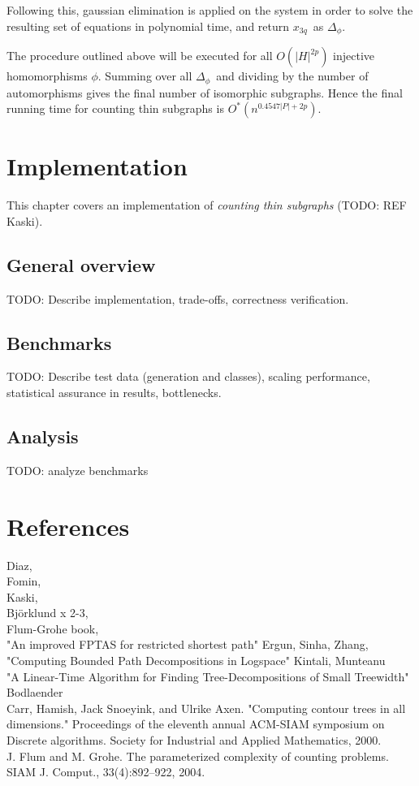 \documentclass[a4paper,11pt]{report}
\theoremstyle{plain}
\theoremstyle{definition}
\begin{document}
Following this, gaussian elimination is applied on the system in order to solve the resulting set of equations in polynomial time, and return $x_{3q}$ as $\Delta_\phi$.

The procedure outlined above will be executed for all $O(|H|^{2p})$ injective homomorphisms $\phi$.
Summing over all $\Delta_\phi$ and dividing by the number of automorphisms gives the final number of isomorphic subgraphs.
Hence the final running time for counting thin subgraphs is $O^*(n^{0.4547|P| + 2p})$.

\chapter{Implementation}
This chapter covers an implementation of \emph{counting thin subgraphs} (TODO: REF Kaski).

\section{General overview}
TODO: Describe implementation, trade-offs, correctness verification.

\section{Benchmarks}
TODO: Describe test data (generation and classes), scaling performance,
statistical assurance in results, bottlenecks.

\section{Analysis}
TODO: analyze benchmarks

\chapter*{References}

Diaz,\\
Fomin,\\
Kaski,\\
Björklund x 2-3,\\
Flum-Grohe book, \\
"An improved FPTAS for restricted shortest path" Ergun, Sinha, Zhang,\\
"Computing Bounded Path Decompositions in Logspace" Kintali, Munteanu\\
"A Linear-Time Algorithm for Finding Tree-Decompositions of Small Treewidth" Bodlaender\\
Carr, Hamish, Jack Snoeyink, and Ulrike Axen. "Computing contour trees in all dimensions." Proceedings of the eleventh annual ACM-SIAM symposium on Discrete algorithms. Society for Industrial and Applied Mathematics, 2000.\\
J. Flum and M. Grohe. The parameterized complexity of counting problems. SIAM J. Comput., 33(4):892–922, 2004.
\end{document}
